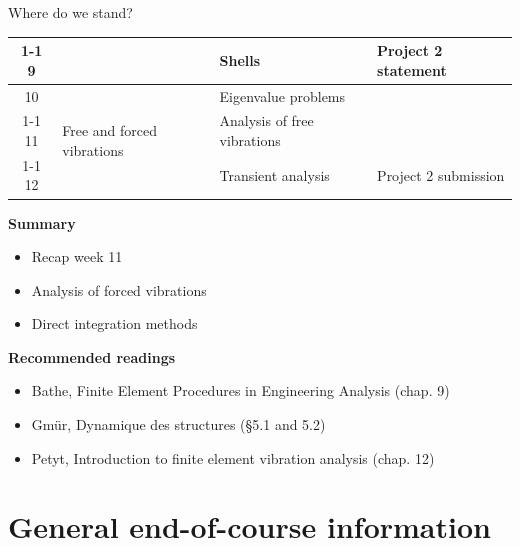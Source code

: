 \documentclass[aspectratio=169]{beamer}
\begin{document}
{\begin{frame}{Where do we stand?}
\begin{center}
\begin{tabular}{|c|l|l|l|}
        \cline{1-1} \cline{3-4}
        9                                  &                                                & Shells                             & Project 2 statement    \\
        \hline
        10                                 & \multirow{3}{7em}{Free and forced vibrations}  & Eigenvalue problems                &                        \\
        \cline{1-1} \cline{3-4} 11         &                                                & Analysis of free vibrations        &                        \\
        \cline{1-1} \cline{3-4} 12         &                                                & Transient analysis                 & Project 2 submission   \\
        \hline
      \end{tabular}
    \end{center}
    \vspace{1cm}
  \end{frame}

  \begin{frame}
    \textbf{\large Summary}
    \begin{itemize}
      \item Recap week 11
      \item Analysis of forced vibrations
      \item Direct integration methods
    \end{itemize}
    \vspace{.5cm}

    \textbf{\large Recommended readings}
    \begin{itemize}
      \item[(B)] Bathe, Finite Element Procedures in Engineering Analysis (chap. 9)
      \item[(G)] Gmür, Dynamique des structures (§5.1 and 5.2)
      \item[(P)] Petyt, Introduction to finite element vibration analysis (chap. 12)
    \end{itemize}
  \end{frame}
}

\section{General end-of-course information}
\end{document}

